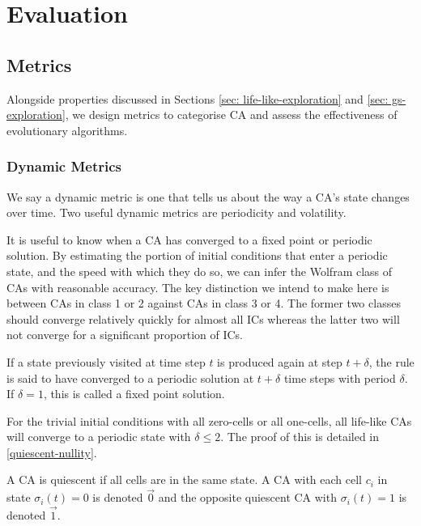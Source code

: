 \chapter{Evaluation} \label{evaluation}

\section{Metrics}
Alongside properties discussed in Sections \ref{sec: life-like-exploration} and \ref{sec: gs-exploration}, we design metrics to categorise CA and assess the effectiveness of evolutionary algorithms.

\subsection{Dynamic Metrics} 
We say a dynamic metric is one that tells us about the way a CA's state changes over time. Two useful dynamic metrics are periodicity and volatility.

It is useful to know when a CA has converged to a fixed point or periodic solution. By estimating the portion of initial conditions that enter a periodic state, and the speed with which they do so, we can infer the Wolfram class of CAs with reasonable accuracy. The key distinction we intend to make here is between CAs in class 1 or 2 against CAs in class 3 or 4. The former two classes should converge relatively quickly for almost all ICs whereas the latter two will not converge for a significant proportion of ICs.

\begin{definition}
 If a state previously visited at time step $t$ is produced again at step $t+\delta$, the rule is said to have converged to a periodic solution at $t+\delta$ time steps with period $\delta$. If $\delta = 1$, this is called a fixed point solution. 
\end{definition}

For the trivial initial conditions with all zero-cells or all one-cells, all life-like CAs will converge to a periodic state with $\delta \leq 2$. The proof of this is detailed in \ref{quiescent-nullity}.

\begin{definition}[Quiescence]
A CA is quiescent if all cells are in the same state. A CA with each cell $c_i$ in state $\sigma_i(t) = 0$ is denoted $\vec{0}$ and the opposite quiescent CA with $\sigma_i(t) = 1$ is denoted $\vec{1}$. 
\end{definition}

